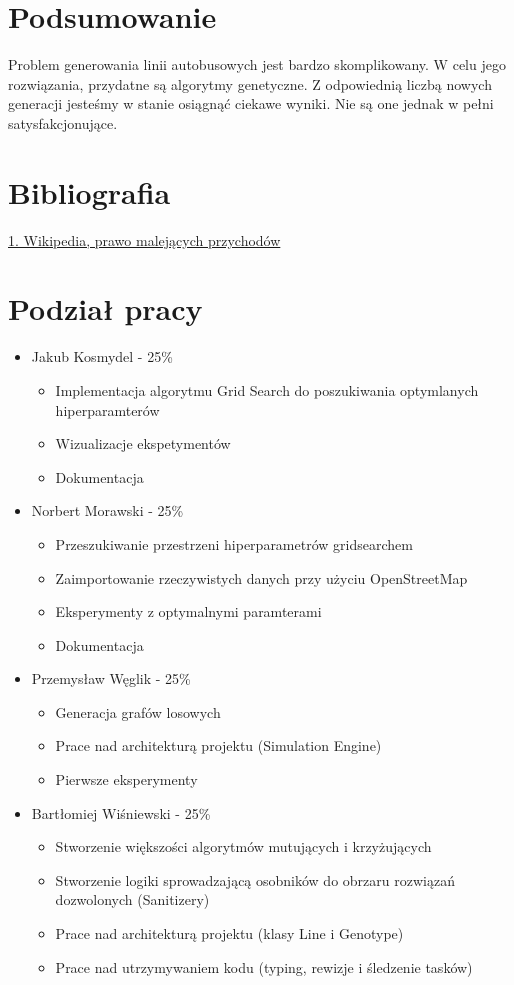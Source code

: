 \documentclass[12pt,a4paper,openright]{mwrep}
\begin{document}
\chapter{Podsumowanie}

Problem generowania linii autobusowych jest bardzo skomplikowany. W celu jego rozwiązania, przydatne są algorytmy genetyczne. Z odpowiednią liczbą nowych generacji jesteśmy w stanie osiągnąć ciekawe wyniki. Nie są one jednak w pełni satysfakcjonujące.

\chapter{Bibliografia}
\href{https://pl.wikipedia.org/wiki/Prawo_malej%C4%85cych_przychod%C3%B3w}{1. Wikipedia, prawo malejących przychodów}


\chapter{Podział pracy}
\begin{itemize}
    \item Jakub Kosmydel - 25\%
    \begin{itemize}
        \item Implementacja algorytmu Grid Search do poszukiwania optymlanych hiperparamterów
        \item Wizualizacje ekspetymentów
        \item Dokumentacja
    \end{itemize}
    \item Norbert Morawski - 25\%
    \begin{itemize}
        \item Przeszukiwanie przestrzeni hiperparametrów gridsearchem
        \item Zaimportowanie rzeczywistych danych przy użyciu OpenStreetMap
        \item Eksperymenty z optymalnymi paramterami
        \item Dokumentacja
    \end{itemize}
    \item Przemysław Węglik - 25\%
    \begin{itemize}
        \item Generacja grafów losowych
        \item Prace nad architekturą projektu (Simulation Engine)
        \item Pierwsze eksperymenty
    \end{itemize}
    \item Bartłomiej Wiśniewski - 25\%
    \begin{itemize}
        \item Stworzenie większości algorytmów mutujących i krzyżujących
        \item Stworzenie logiki sprowadzającą osobników do obrzaru rozwiązań dozwolonych (Sanitizery)
        \item Prace nad architekturą projektu (klasy Line i Genotype)
        \item Prace nad utrzymywaniem kodu (typing, rewizje i śledzenie tasków)
    \end{itemize}
\end{itemize}
\end{document}
